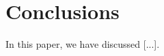 \section{Conclusions}
\label{se:conclusions}

In this paper, we have discussed [...].
  
  
  
  
  